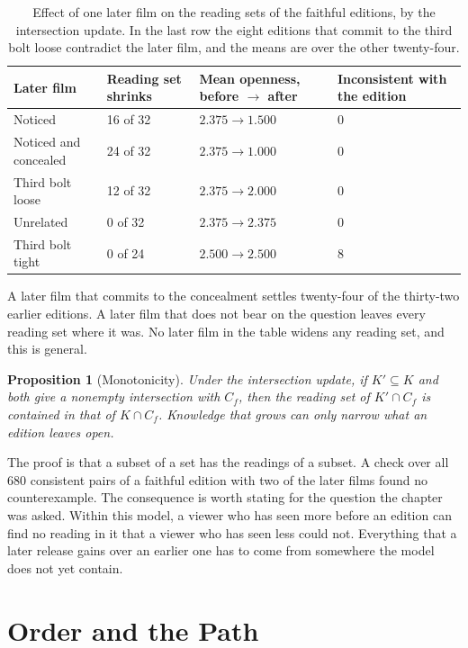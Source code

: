 \documentclass[11pt,twoside,openright]{book}
\theoremstyle{plain}
\newtheorem{proposition}[theorem]{Proposition}
\theoremstyle{definition}
\theoremstyle{remark}
\begin{document}
\begin{table}[ht]
\centering
\begin{tabular}{@{}lp{2.6cm}p{3cm}p{2.4cm}@{}}
\toprule
Later film & Reading set shrinks & Mean openness, before $\to$ after & Inconsistent with the edition\\
\midrule
Noticed & 16 of 32 & $2.375\to1.500$ & 0\\
Noticed and concealed & 24 of 32 & $2.375\to1.000$ & 0\\
Third bolt loose & 12 of 32 & $2.375\to2.000$ & 0\\
Unrelated & 0 of 32 & $2.375\to2.375$ & 0\\
Third bolt tight & 0 of 24 & $2.500\to2.500$ & 8\\
\bottomrule
\end{tabular}
\caption{Effect of one later film on the reading sets of the faithful editions, by the intersection update. In the last row the eight editions that commit to the third bolt loose contradict the later film, and the means are over the other twenty-four.}\label{tab:retro14}
\end{table}

A later film that commits to the concealment settles twenty-four of the thirty-two earlier editions. A later film that does not bear on the question leaves every reading set where it was. No later film in the table widens any reading set, and this is general.

\begin{proposition}[Monotonicity]\label{prop:mono14}
Under the intersection update, if $K'\subseteq K$ and both give a nonempty intersection with $C_f$, then the reading set of $K'\cap C_f$ is contained in that of $K\cap C_f$. Knowledge that grows can only narrow what an edition leaves open.
\end{proposition}

The proof is that a subset of a set has the readings of a subset. A check over all $680$ consistent pairs of a faithful edition with two of the later films found no counterexample. The consequence is worth stating for the question the chapter was asked. Within this model, a viewer who has seen more before an edition can find no reading in it that a viewer who has seen less could not. Everything that a later release gains over an earlier one has to come from somewhere the model does not yet contain.

\section{Order and the Path}\label{sec:path14}
\end{document}
